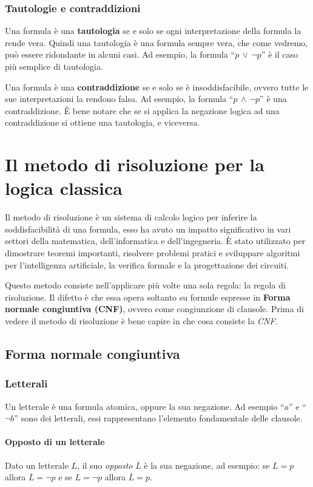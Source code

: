 \documentclass[a4paper,12pt]{report}
\begin{document}
\subsection{Tautologie e contraddizioni}
\label{taut-contr}
Una formula è una \textbf{tautologia} se e solo se ogni interpretazione della formula la rende vera. Quindi una tautologia è una formula sempre vera, che come vedremo, può essere ridondante in alcuni casi. Ad esempio, la formula ``$p \, \lor \, \lnot p$'' è il caso più semplice di tautologia.

Una formula è una \textbf{contraddizione} se e solo se è insoddisfacibile, ovvero tutte le sue interpretazioni la rendono falsa. Ad esempio, la formula ``$p \, \land \, \lnot p$'' è una contraddizione. \`E bene notare che se si applica la negazione logica ad una contraddizione si ottiene una tautologia, e viceversa.

% 
% 
\chapter{Il metodo di risoluzione per la logica classica}
\label{resol}
Il metodo di risoluzione è un sistema di calcolo logico per inferire la soddisfacibilità di una formula, esso ha avuto un impatto significativo in vari settori della matematica, dell'informatica e dell'ingegneria. È stato utilizzato per dimostrare teoremi importanti, risolvere problemi pratici e sviluppare algoritmi per l'intelligenza artificiale, la verifica formale e la progettazione dei circuiti. 

Questo metodo consiste nell'applicare più volte una sola regola: la regola di risoluzione. Il difetto è che essa opera soltanto su formule espresse in \textbf{Forma normale congiuntiva (CNF)}, ovvero come congiunzione di clausole. Prima di vedere il metodo di risoluzione è bene capire in che cosa consiste la \emph{CNF}.

\section{Forma normale congiuntiva}
\label{CNF}
\subsection{Letterali}
Un letterale è una formula atomica, oppure la sua negazione. Ad esempio ``$a$'' e ``$\lnot b$'' sono dei letterali, essi rappresentano l'elemento fondamentale delle clausole.

\subsubsection{Opposto di un letterale}
Dato un letterale $L$, il suo \emph{opposto} $\overline{L}$ è la sua negazione, ad esempio: se $L = p$ allora $\overline{L} = \lnot p$ e se $L = \lnot p$ allora $\overline{L} = p$.
\end{document}
